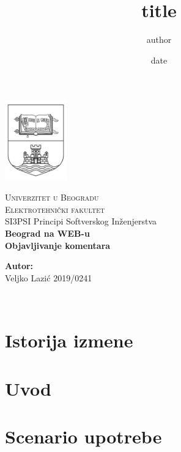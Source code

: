 \documentclass[12pt]{report}
\begin{document}
\title{title}
\author{author}
\date{date}

\begin{titlepage}
\begin{center}
    \includegraphics[width=0.2\textwidth]{logo.jpg}
\end{center}
\begin{center}
    \textsc{ \LARGE{Univerzitet u Beogradu \\}}
	\textsc{ \LARGE{Elektrotehnički fakultet\\ }}
	\textnormal{ \LARGE{SI3PSI Principi Softverskog Inženjerstva\\}}
	\vspace{30mm}
	\fontsize{10mm}{7mm}\selectfont 
    \textbf{\textup{Beograd na WEB-u}}\\
    \textbf{Objavljivanje komentara}\\
\end{center}

\vspace{25mm}

\begin{minipage}[t]{0.47\textwidth}
	\textnormal{\large{\bf Autor:\\}}
	{\large Veljko Lazić 2019/0241}\\
\end{minipage}

\vspace{20mm}

\\

\end{titlepage}


\chapter{\color{RoyalBlue}Istorija izmene}

\chapter{\color{RoyalBlue}Uvod}

\chapter{\color{RoyalBlue}Scenario upotrebe}

\end{document}
